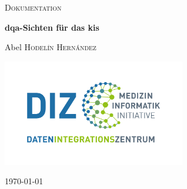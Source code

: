 \begin{titlepage}
	\thispagestyle{firstpage}	
	\centering
	\vspace*{3cm}
	{\scshape\LARGE Dokumentation\par}
	\vspace{1.5cm}
	{\huge \bfseries \acs{dqa}-Sichten für das \ac{kis}\par}
	\vspace{2cm}
	{\Large Abel \textsc{Hodelín Hernández}\par} 
	\vspace{2cm}
	\includegraphics[width=8cm]{figures/diz.jpg}
	\vfill
	{\large \today\par}
\end{titlepage}
